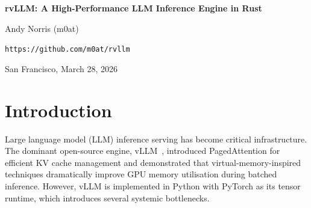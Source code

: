 \documentclass[11pt,a4paper]{article}
\begin{document}
\begin{center}
  {\LARGE\bfseries rvLLM: A High-Performance LLM Inference Engine in Rust\par}
  \vspace{0.6em}
  {\large Andy Norris (m0at)\par}
  \vspace{0.3em}
  {\normalsize\texttt{https://github.com/m0at/rvllm}\par}
  \vspace{0.3em}
  {\normalsize San Francisco, March 28, 2026\par}
\end{center}
\vspace{1em}

\begin{abstract}
I present rvLLM, a from-scratch Rust implementation of the vLLM inference engine
for OpenAI-compatible API serving with CUDA GPU acceleration. The system comprises
23~Rust crates and 15~pre-compiled CUDA PTX kernels, compiling to a single 16\,MB
static binary. On a single NVIDIA B200 (180\,GB), rvLLM achieves 3{,}946~tok/s
serving Qwen2.5-1.5B with zero errors across 13{,}553 verified requests at batch
sizes up to $N\!=\!4{,}096$. On a single A100 SXM4 (40\,GB), it reaches
3{,}191~tok/s---\textbf{16$\times$ faster} than Python vLLM~0.18 on identical
hardware. This speedup derives from three reinforcing mechanisms: (1)~GPU-resident
greedy decoding via an argmax kernel that reduces device-to-host transfer by
$\sim$32{,}000$\times$ per token, (2)~CUDA graph replay that collapses the entire
decode forward pass into a single driver call, and (3)~a zero-copy memory architecture
with no Python objects, no PyTorch tensor metadata, and no garbage collector.
Startup time is 6--9 seconds versus 121 seconds for Python vLLM, CPU RSS is
348\,MB versus 1{,}033\,MB, and the binary is 31$\times$ smaller. rvLLM is
open-source under the Apache-2.0 license.
\end{abstract}

\section{Introduction}
\label{sec:introduction}

Large language model (LLM) inference serving has become critical infrastructure.
The dominant open-source engine, vLLM~\cite{kwon2023vllm}, introduced PagedAttention
for efficient KV cache management and demonstrated that virtual-memory-inspired
techniques dramatically improve GPU memory utilisation during batched inference.
However, vLLM is implemented in Python with PyTorch as its tensor runtime, which
introduces several systemic bottlenecks.
\end{document}
